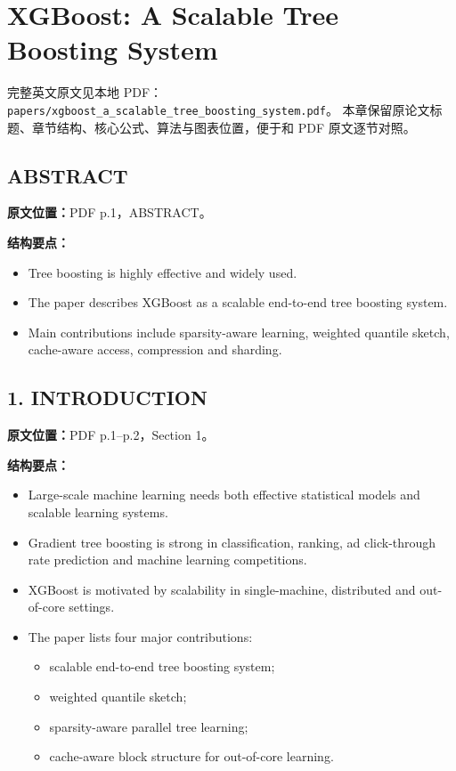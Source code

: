 \chapter{XGBoost: A Scalable Tree Boosting System}

\begin{note}
完整英文原文见本地 PDF：
\texttt{papers/xgboost\_a\_scalable\_tree\_boosting\_system.pdf}。
本章保留原论文标题、章节结构、核心公式、算法与图表位置，便于和 PDF 原文逐节对照。
\end{note}

\section{ABSTRACT}

\textbf{原文位置：}PDF p.1，ABSTRACT。

\textbf{结构要点：}
\begin{itemize}
  \item Tree boosting is highly effective and widely used.
  \item The paper describes XGBoost as a scalable end-to-end tree boosting system.
  \item Main contributions include sparsity-aware learning, weighted quantile sketch, cache-aware access, compression and sharding.
\end{itemize}

\section{1. INTRODUCTION}

\textbf{原文位置：}PDF p.1--p.2，Section 1。

\textbf{结构要点：}
\begin{itemize}
  \item Large-scale machine learning needs both effective statistical models and scalable learning systems.
  \item Gradient tree boosting is strong in classification, ranking, ad click-through rate prediction and machine learning competitions.
  \item XGBoost is motivated by scalability in single-machine, distributed and out-of-core settings.
  \item The paper lists four major contributions:
  \begin{itemize}
    \item scalable end-to-end tree boosting system;
    \item weighted quantile sketch;
    \item sparsity-aware parallel tree learning;
    \item cache-aware block structure for out-of-core learning.
  \end{itemize}
\end{itemize}

